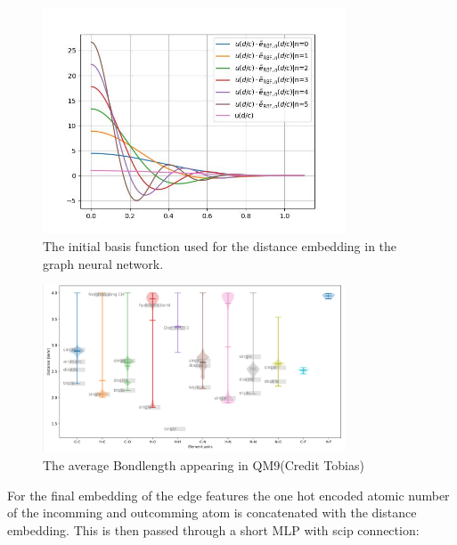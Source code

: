 \begin{figure}
    \centering
    \includegraphics[width=0.8\textwidth]{chapters/foundations/images_foundation/bessel_embedding}
    \caption{The initial basis function used for the distance embedding in the graph neural network.}
    \label{fig:bessel_embedding}
\end{figure}
\begin{figure}
    \centering
    \includegraphics[width=0.8\textwidth]{chapters/foundations/images_foundation/bondlength}
    \caption{The average Bondlength appearing in QM9(Credit Tobias)}
    \label{fig:bond_length}
\end{figure}
For the final embedding of the edge features the one hot encoded atomic number of the incomming and outcomming atom is concatenated with the distance embedding. This is then passed through a short MLP\cite{mlp} with scip connection:
